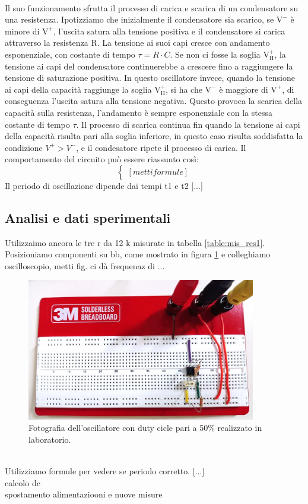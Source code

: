 \documentclass{report}
\begin{document}
\\Il suo funzionamento sfrutta il processo di carica e scarica di un condensatore su una resistenza. Ipotizziamo che inizialmente il condensatore sia scarico, se $\mathrm{V^-}$ è minore di $\mathrm{V^+}$, l'uscita satura alla tensione positiva e il condensatore si carica attraverso la resistenza $\mathrm{R}$. La tensione ai suoi capi cresce con andamento esponenziale, con costante di tempo $\displaystyle{\tau=R\cdot C}$. Se non ci fosse la soglia $\mathrm{V_H^+}$, la tensione ai capi del condensatore continuerebbe a crescere fino a raggiungere la tensione di saturazione positiva. In questo oscillatore invece, quando la tensione ai capi della capacità raggiunge la soglia $\mathrm{V_H^+}$, si ha che $\mathrm{V^-}$ è maggiore di $\mathrm{V^+}$, di conseguenza l'uscita satura alla tensione negativa. Questo provoca la scarica della capacità sulla resistenza, l'andamento è sempre esponenziale con la stessa costante di tempo $\tau$. Il processo di scarica continua fin quando la tensione ai capi della capacità risulta pari alla soglia inferiore, in questo caso risulta soddisfatta la condizione $V^+>V^-$, e il condesatore ripete il processo di carica. Il comportamento del circuito può essere riassunto così:
\begin{equation}
   \begin{cases}
   [metti formule]
   \end{cases}
\end{equation}
Il periodo di oscillazione dipende dai tempi t1 e t2 [...]
\subsection{Analisi e dati sperimentali}
Utilizzaimo ancora le tre r da 12 k misurate in tabella \ref{table:mis_res1}. Posizioniamo componenti su bb, come mostrato in figura \ref{figura:circuito3} e colleghiamo oscilloscopio, metti fig. ci dà frequenaz di ...
\begin{figure}[h]
	\centering
	\includegraphics[height=6.2cm]{immagini/circuito3}
	\caption{Fotografia dell'oscillatore con duty cicle pari a 50\% realizzato in laboratorio.}
	\label{figura:circuito3}
\end{figure}
\\Utilizziamo formule per vedere se periodo corretto.
[...]
\\calcolo dc
\\spostamento alimentaziooni e nuove misure
\newpage
\end{document}
